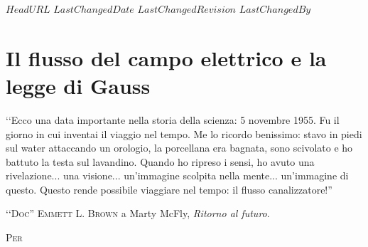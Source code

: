 \svnidlong
{$HeadURL$}
{$LastChangedDate$}
{$LastChangedRevision$}
{$LastChangedBy$}

\chapter{Il flusso del campo elettrico e la legge di Gauss}

\begin{introduction}
	‘‘Ecco una data importante nella storia della scienza: 5 novembre 1955. Fu il giorno in cui inventai il viaggio nel tempo. Me lo ricordo benissimo: stavo in piedi sul water attaccando un orologio, la porcellana era bagnata, sono scivolato e ho battuto la testa sul lavandino. Quando ho ripreso i sensi, ho avuto una rivelazione... una visione... un'immagine scolpita nella mente... un'immagine
	di questo. Questo rende possibile viaggiare nel tempo: il flusso canalizzatore!''
	\begin{flushright}
		\textsc{‘‘Doc'' Emmett L. Brown} a Marty McFly, \textit{Ritorno al futuro}.
	\end{flushright}
\end{introduction}
\lettrine[findent=1pt, nindent=0pt]{P}{er}  %
